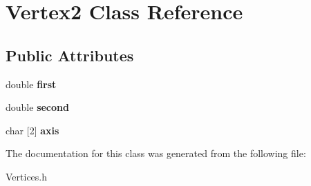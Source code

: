 \hypertarget{class_vertex2}{}\section{Vertex2 Class Reference}
\label{class_vertex2}
\subsection*{Public Attributes}
\begin{DoxyCompactItemize}
\item 
\mbox{\label{class_vertex2_a8b50d01539dc19955f6b123c63306904}} 
double {\bfseries first}
\item 
\mbox{\label{class_vertex2_a0958f405bb576cbbf596bc114be3c136}} 
double {\bfseries second}
\item 
\mbox{\label{class_vertex2_a579e935bcf88c956e142aa51d0a25b0e}} 
char \mbox{[}2\mbox{]} {\bfseries axis}
\end{DoxyCompactItemize}


The documentation for this class was generated from the following file\+:\begin{DoxyCompactItemize}
\item 
Vertices.\+h\end{DoxyCompactItemize}
